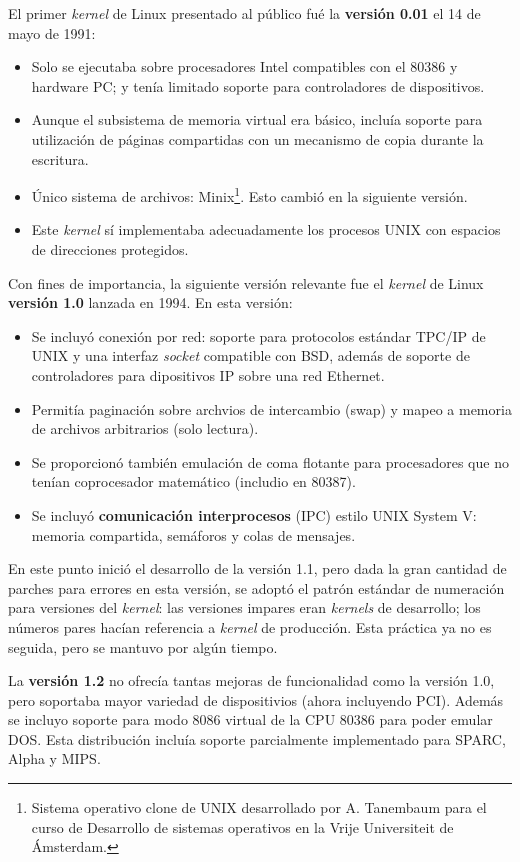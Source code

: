 \documentclass[spanish]{article}
\begin{document}
El primer \textit{kernel} de Linux presentado al público fué la \textbf{versión 0.01} el 14 de mayo de 1991:
\begin{itemize}
	\item Solo se ejecutaba sobre procesadores Intel compatibles con el 80386 y hardware PC; y tenía limitado soporte para controladores de dispositivos.
	\item Aunque el subsistema de memoria virtual era básico, incluía soporte para utilización de páginas compartidas con un mecanismo de copia durante la escritura.
	\item Único sistema de archivos: Minix\footnote{Sistema operativo clone de UNIX desarrollado por A. Tanembaum para el curso de Desarrollo de sistemas operativos en la  Vrije Universiteit de Ámsterdam.\cite{MinixWikipedia}}. Esto cambió en la siguiente versión.
	\item Este \textit{kernel} sí implementaba adecuadamente los procesos UNIX con espacios de direcciones protegidos. 
\end{itemize}
Con fines de importancia, la siguiente versión relevante fue el \textit{kernel} de Linux \textbf{versión 1.0} lanzada en 1994. En esta versión:
\begin{itemize}
	\item Se incluyó conexi\'{o}n por red: soporte para protocolos est\'{a}ndar TPC/IP de UNIX y una interfaz \textit{socket} compatible con BSD, además de soporte de controladores para dipositivos IP sobre una red Ethernet.
	\item Permitía paginación sobre archvios de intercambio (swap) \cite{ArchivoAlegsa} y mapeo a memoria de archivos arbitrarios (solo lectura).
	\item Se proporcionó también emulación de coma flotante para procesadores que no tenían coprocesador matemático (includio en 80387).
	\item Se incluyó \textbf{comunicación interprocesos} (IPC) estilo UNIX System V: memoria compartida, semáforos y colas de mensajes. 
\end{itemize}
En este punto inició el desarrollo de la versión 1.1, pero dada la gran cantidad de parches para errores en esta versión, se adoptó el patrón estándar de numeración para versiones del \textit{kernel}: las versiones impares eran \textit{kernels} de desarrollo; los números pares hacían referencia a \textit{kernel} de producción. Esta práctica ya no es seguida, pero se mantuvo por algún tiempo.

La \textbf{versión 1.2} no ofrecía tantas mejoras de funcionalidad como la versión 1.0, pero soportaba mayor variedad de dispositivios (ahora incluyendo PCI). Además se incluyo soporte para modo 8086 virtual de la CPU 80386 para poder emular DOS. Esta distribución incluía soporte parcialmente implementado para SPARC, Alpha y MIPS. 
\end{document}
